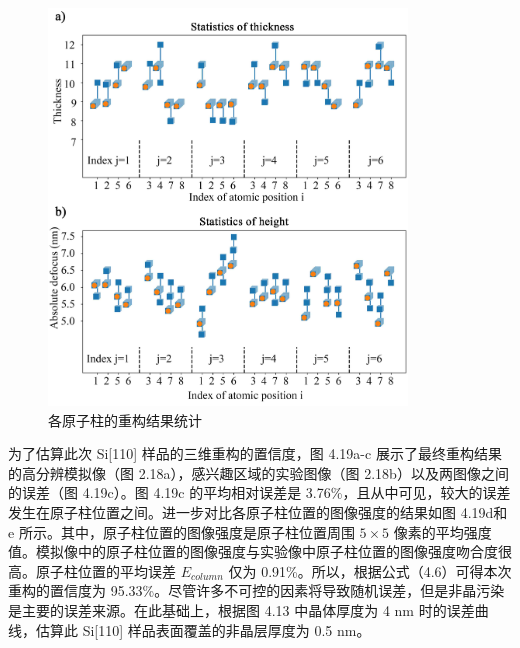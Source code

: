 \begin{figure}[H]
	\vspace{\baselineskip}
	\centering
	\includegraphics[width=0.85\textwidth]{../2.17/217}
	\caption{各原子柱的重构结果统计}\label{fig:217}
	\song{}
\end{figure}




为了估算此次 Si[110] 样品的三维重构的置信度，图 4.19a-c 
展示了最终重构结果的高分辨模拟像（图 2.18a），感兴趣区域的实验图像（图 2.18b）以及两图像之间的误差（图 4.19c）。图 4.19c 的平均相对误差是 3.76\%，且从中可见，较大的误差发生在原子柱位置之间。进一步对比各原子柱位置的图像强度的结果如图 4.19d和 e 所示。其中，原子柱位置的图像强度是原子柱位置周围 $5\times 5$ 像素的平均强度值。模拟像中的原子柱位置的图像强度与实验像中原子柱位置的图像强度吻合度很高。原子柱位置的平均误差 $E_{column}$ 仅为 0.91\%。所以，根据公式（4.6）可得本次重构的置信度为 95.33\%。尽管许多不可控的因素将导致随机误差，但是非晶污染是主要的误差来源。在此基础上，根据图 4.13 中晶体厚度为 4 nm 时的误差曲线，估算此 Si[110] 样品表面覆盖的非晶层厚度为 0.5 nm。




